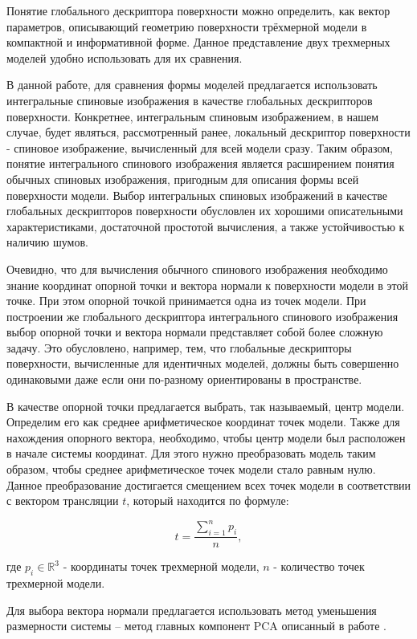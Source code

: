 \documentclass[14pt]{article}
\numberwithin{figure}{section}
\numberwithin{equation}{section}
\begin{document}
Понятие глобального дескриптора поверхности можно определить, как вектор параметров, описывающий геометрию поверхности трёхмерной модели в компактной и информативной форме. Данное представление двух трехмерных моделей удобно использовать для их сравнения.

В данной работе, для сравнения формы моделей предлагается использовать интегральные спиновые изображения в качестве глобальных дескрипторов поверхности. Конкретнее, интегральным спиновым изображением, в нашем случае, будет являться, рассмотренный ранее, локальный дескриптор поверхности - спиновое изображение, вычисленный для всей модели сразу. Таким образом, понятие интегрального спинового изображения является расширением понятия обычных спиновых изображения, пригодным для описания формы всей поверхности модели.
Выбор интегральных спиновых изображений в качестве глобальных дескрипторов поверхности обусловлен их хорошими описательными характеристиками, достаточной простотой вычисления, а также устойчивостью к наличию шумов.

Очевидно, что для вычисления обычного спинового изображения необходимо знание координат опорной точки и вектора нормали к поверхности модели в этой точке. При этом опорной точкой принимается одна из точек модели. При построении же глобального дескриптора интегрального спинового изображения выбор опорной точки и вектора нормали представляет собой более сложную задачу. Это обусловлено, например, тем, что глобальные дескрипторы поверхности, вычисленные для идентичных моделей, должны быть совершенно одинаковыми даже если они по-разному ориентированы в пространстве.

В качестве опорной точки предлагается выбрать, так называемый, центр модели. Определим его как среднее арифметическое координат точек модели. Также для нахождения опорного вектора, необходимо, чтобы центр модели был расположен в начале системы координат. Для этого нужно преобразовать модель таким образом, чтобы среднее арифметическое точек модели стало равным нулю. Данное преобразование достигается смещением всех точек модели в соответствии с вектором трансляции $t$, который находится по формуле:

\begin{equation}
	t = \frac{\sum\limits^{n}_{i = 1} p_i}{n},
\end{equation}

где $p_i \in \mathbb{R}^3$ - координаты точек трехмерной модели, $n$ - количество точек трехмерной модели.

Для выбора вектора нормали предлагается использовать метод уменьшения размерности системы – метод главных компонент PCA описанный в работе \cite{Chernikoff}.
\end{document}
